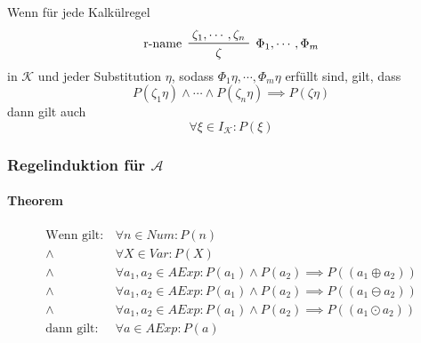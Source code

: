 																		Wenn für jede Kalkülregel
																		\begin{equation*}
																			\prftree[l, r]
																			{ $ \Phi _ 1, \cdots, \Phi _ m $ }
																			{ r-name }
																			{ \zeta _ 1, \cdots, \zeta _ n }
																			{ \zeta }
																		\end{equation*}
																		in $ \mathcal{K} $ und jeder Substitution $ \eta $, sodass $ \Phi _ 1 \eta, \cdots, \Phi _ m \eta $ erfüllt sind, gilt, dass
																		\begin{equation*}
																			P(\zeta _ 1 \eta) \land \cdots \land P(\zeta _ n \eta) \implies P(\zeta\eta)
																		\end{equation*}
																		dann gilt auch
																		\begin{equation*}
																			\forall \xi \in I _ \mathcal{K} : P(\xi)
																		\end{equation*}

																\subsubsection{Regelinduktion für $ \mathcal{A} $}
																	\paragraph{Theorem}
																		\begin{align*}
																			\text{Wenn gilt:} & \,\forall n \in \textit{Num} : P(n)                                                                  \\
																			\land             & \,\forall X \in \textit{Var} : P(X)                                                                  \\
																			\land             & \,\forall a _ 1, a _ 2 \in \textit{AExp} : P(a _ 1) \land P(a _ 2) \implies P((a _ 1 \oplus a _ 2))  \\
																			\land             & \,\forall a _ 1, a _ 2 \in \textit{AExp} : P(a _ 1) \land P(a _ 2) \implies P((a _ 1 \ominus a _ 2)) \\
																			\land             & \,\forall a _ 1, a _ 2 \in \textit{AExp} : P(a _ 1) \land P(a _ 2) \implies P((a _ 1 \odot a _ 2))   \\
																			\text{dann gilt:} & \,\forall a \in \textit{AExp} : P(a)                                                                 \\
																		\end{align*}

